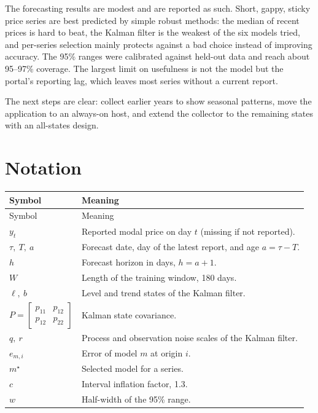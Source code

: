 \documentclass[12pt,a4paper,oneside]{report}
\numberwithin{equation}{chapter}
\numberwithin{figure}{chapter}
\numberwithin{table}{chapter}
\theoremstyle{definition}
\begin{document}
The forecasting results are modest and are reported as such. Short, gappy, sticky price series are best predicted by simple robust methods: the median of recent prices is hard to beat, the Kalman filter is the weakest of the six models tried, and per-series selection mainly protects against a bad choice instead of improving accuracy. The 95\% ranges were calibrated against held-out data and reach about 95--97\% coverage. The largest limit on usefulness is not the model but the portal's reporting lag, which leaves most series without a current report.

The next steps are clear: collect earlier years to show seasonal patterns, move the application to an always-on host, and extend the collector to the remaining states with an all-states design.

\appendix
\chapter{Notation}
\begin{longtable}{@{}p{}p{}@{}}
\toprule
Symbol & Meaning \\
\midrule
\endfirsthead
\toprule
Symbol & Meaning \\
\midrule
\endhead
$y_t$ & Reported modal price on day $t$ (missing if not reported). \\
$\tau,\ T,\ a$ & Forecast date, day of the latest report, and age $a=\tau-T$. \\
$h$ & Forecast horizon in days, $h=a+1$. \\
$W$ & Length of the training window, 180 days. \\
$\ell,\ b$ & Level and trend states of the Kalman filter. \\
$P=\begin{bmatrix}p_{11}&p_{12}\\p_{12}&p_{22}\end{bmatrix}$ & Kalman state covariance. \\
$q,\ r$ & Process and observation noise scales of the Kalman filter. \\
$e_{m,i}$ & Error of model $m$ at origin $i$. \\
$m^\star$ & Selected model for a series. \\
$c$ & Interval inflation factor, 1.3. \\
$w$ & Half-width of the 95\% range. \\
\bottomrule
\end{longtable}
\end{document}
